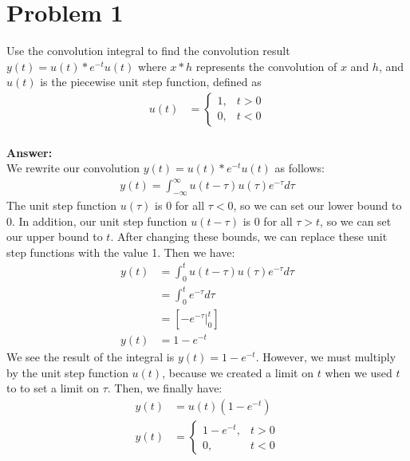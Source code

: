 \documentclass[12pt, a4paper]{article}
\begin{document}
\vspace*{-3mm}
\section*{Problem 1} 
Use the convolution integral to find the convolution result $y(t) = u(t) * e^{-t} u(t)$ where $x * h$ represents the convolution of $x$ and $h$, and $u(t)$ is the piecewise unit step function, defined as   \begin{align*}
    u(t) &= \begin{cases}
      1, & t > 0 \\
      0, & t < 0
    \end{cases}
  \end{align*}\\
\textbf{Answer: } \\
We rewrite our convolution $y(t) = u(t) * e^{-t} u(t)$ as follows:
\begin{align*}
y(t) = \int_{-\infty}^{\infty} u(t- \tau) u(\tau) e^{-\tau} d\tau
\end{align*}
The unit step function $u(\tau)$ is 0 for all $\tau <0$, so we can set our lower bound to 0. In addition, our unit step function $u(t-\tau)$ is 0 for all $\tau > t$, so we can set our upper bound to $t$. After changing these bounds, we can replace these unit step functions with the value 1. Then we have:
\begin{align*}
y(t) &= \int_{0}^{t} u(t- \tau) u(\tau) e^{-\tau} d\tau \\
&= \int_{0}^{t} e^{-\tau} d\tau \\
&= \left [- e^{-\tau} |_{0}^{t} \right ] \\
y(t) &= 1- e^{-t}
\end{align*}
We see the result of the integral is $y(t) = 1- e^{-t}$. However, we must multiply by the unit step function $u(t)$, because we created a limit on $t$ when we used $t$ to to set a limit on $\tau$. Then, we finally have:
\begin{align*}
y(t) &= u(t)(1- e^{-t}) \\
    y(t) &= \begin{cases}
      1-e^{-t}, & t > 0 \\
      0, & t < 0
    \end{cases}
\end{align*}
\end{document}
